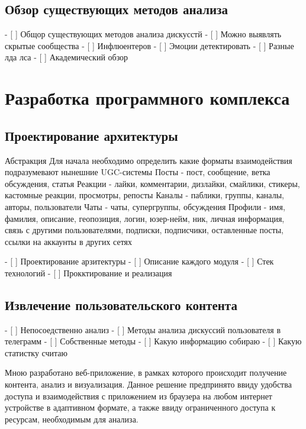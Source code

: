 \documentclass[a4paper,article,14pt]{extarticle}
\begin{document}
\subsection{Обзор существующих методов анализа}

    - [ ] Общор существующих методов анализа дискусстй
        - [ ] Можно выявлять скрытые сообщества
        - [ ] Инфлюентеров
        - [ ] Эмоции детектировать
        - [ ] Разные лда лса
        - [ ] Академический обзор

\section{Разработка программного комплекса}
\subsection{Проектирование архитектуры}

Абстракция
Для начала необходимо определить какие форматы взаимодействия подразумевают нынешние UGC-системы
Посты - пост, сообщение, ветка обсуждения, статья
Реакции - лайки, комментарии, дизлайки, смайлики, стикеры, кастомные реакции, просмотры, репосты
Каналы - паблики, группы, каналы, авторы, пользователи
Чаты - чаты, супергруппы, обсуждения
Профили - имя, фамилия, описание, геопозиция, логин, юзер-нейм, ник, личная информация, связь с другими пользователями, подписки, подписчики, оставленные посты, ссылки на аккаунты в других сетях



    - [ ] Проектирование арзитектуры
    - [ ] Описание каждого модуля
    - [ ] Стек технологий
    - [ ] Прокктирование и реализация

\subsection{Извлечение пользовательского контента}

   - [ ] Непосоедственно анализ
    - [ ] Методы анализа дискуссий пользователя в телеграмм
    - [ ] Собственные методы
    - [ ] Какую информацию собираю
    - [ ] Какую статистку считаю



Мною разработано веб-приложение, в рамках которого происходит получение контента, анализ и визуализация. Данное решение предпринято ввиду удобства доступа и взаимодействия с приложением из браузера на любом интернет устройстве в адаптивном формате, а также ввиду ограниченного доступа к ресурсам, необходимым для анализа.
\end{document}
